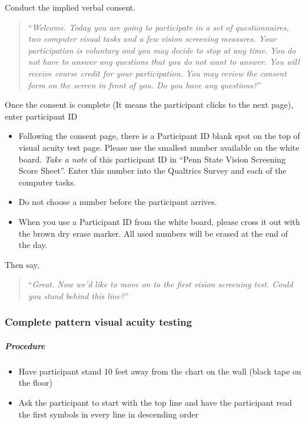 \documentclass[]{article}
\providecommand{\tightlist}{%
  \setlength{\itemsep}{0pt}\setlength{\parskip}{0pt}}
\let\oldsubparagraph\subparagraph
\renewcommand{\subparagraph}[1]{\oldsubparagraph{#1}\mbox{}}
\begin{document}
Conduct the implied verbal consent.

\begin{quote}
``\emph{Welcome. Today you are going to participate in a set of
questionnaires, two computer visual tasks and a few vision screening
measures. Your participation is voluntary and you may decide to stop at
any time. You do not have to answer any questions that you do not want
to answer. You will receive course credit for your participation. You
may review the consent form on the screen in front of you. Do you have
any questions?}''
\end{quote}

Once the consent is complete (It means the participant clicks to the
next page), enter participant ID

\begin{itemize}
\item
  Following the consent page, there is a Participant ID blank spot on
  the top of visual acuity test page. Please use the smallest number
  available on the white board. \emph{Take a note} of this participant
  ID in ``Penn State Vision Screening Score Sheet''. Enter this number
  into the Qualtrics Survey and each of the computer tasks.
\item
  Do not choose a number before the participant arrives.
\item
  When you use a Participant ID from the white board, please cross it
  out with the brown dry erase marker. All used numbers will be erased
  at the end of the day.
\end{itemize}

Then say,

\begin{quote}
``\emph{Great. Now we'd like to move on to the first vision screening
test. Could you stand behind this line?}''
\end{quote}

\hypertarget{complete-pattern-visual-acuity-testing}{%
\subsubsection{Complete pattern visual acuity
testing}\label{complete-pattern-visual-acuity-testing}}

\hypertarget{procedure}{%
\subparagraph{Procedure}\label{procedure}}

\begin{itemize}
\tightlist
\item
  Have participant stand 10 feet away from the chart on the wall (black
  tape on the floor)
\item
  Ask the participant to start with the top line and have the
  participant read the first symbols in every line in descending order
\end{itemize}
\end{document}

